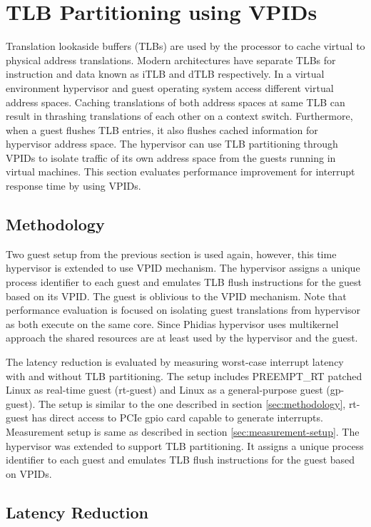 \section{TLB Partitioning using VPIDs} \label{sec:vtlb-latency-red}
Translation lookaside buffers (TLBs) are used by the processor to cache virtual to physical address translations.
Modern architectures have separate TLBs for instruction and data known as iTLB and dTLB respectively. 
In a virtual environment hypervisor and guest operating system access different virtual address spaces.
Caching translations of both address spaces at same TLB can result in thrashing translations of each other on a context switch. 
Furthermore, when a guest flushes TLB entries, it also flushes cached information for hypervisor address space.
The hypervisor can use TLB partitioning through VPIDs to isolate traffic of its own address space from the guests running in virtual machines.
This section evaluates performance improvement for interrupt response time by using VPIDs.

\subsection{Methodology}
Two guest setup from the previous section is used again, however, this time hypervisor is extended to use VPID mechanism.
The hypervisor assigns a unique process identifier to each guest and emulates TLB flush instructions for the guest based on its VPID.
The guest is oblivious to the VPID mechanism.
Note that performance evaluation is focused on isolating guest translations from hypervisor as both execute on the same core.
Since Phidias hypervisor uses multikernel approach the shared resources are at least used by the hypervisor and the guest.

The latency reduction is evaluated by measuring worst-case interrupt latency with and without TLB partitioning.
The setup includes PREEMPT\_RT patched Linux as real-time guest (rt-guest)
and Linux as a general-purpose guest (gp-guest). 
The setup is similar to the one described in section \ref{sec:methodology}, rt-guest has direct access to PCIe gpio card capable to generate interrupts. 
Measurement setup is same as described in section \ref{sec:measurement-setup}.
The hypervisor was extended to support TLB partitioning. 
It assigns a unique process identifier to each guest and emulates TLB flush instructions for the guest based on VPIDs.

\subsection{Latency Reduction}

